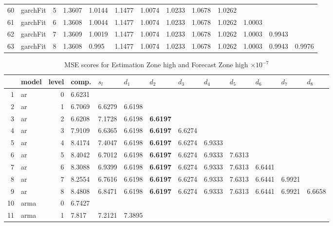 \documentclass[10pt,a4paper]{article}
\begin{document}
\begin{table}[ht]
\begin{tabular}{rlrllllllllll}
  60 & garchFit &     5 & 1.3607 & 1.0144 & 1.1477 & 1.0074 & 1.0233 & 1.0678 & 1.0262 &  &  &  \\ 
  61 & garchFit &     6 & 1.3608 & 1.0044 & 1.1477 & 1.0074 & 1.0233 & 1.0678 & 1.0262 & 1.0003 &  &  \\ 
  62 & garchFit &     7 & 1.3609 & 1.0019 & 1.1477 & 1.0074 & 1.0233 & 1.0678 & 1.0262 & 1.0003 & 0.9943 &  \\ 
  63 & garchFit &     8 & 1.3608 & 0.995 & 1.1477 & 1.0074 & 1.0233 & 1.0678 & 1.0262 & 1.0003 & 0.9943 & 0.9976 \\ 
   \hline
\end{tabular}
\end{table}
\begin{table}[ht]
\centering
\caption{MSE scores for Estimation Zone high and Forecast Zone high $ \times 10^{-7}$} 
\begin{tabular}{rlrllllllllll}
  \hline
 & model & level & comp. & $s_l$ & $d_1$ & $d_2$ & $d_3$ & $d_4$ & $d_5$ & $d_6$ & $d_7$ & $d_8$ \\ 
  \hline
1 & ar &     0 & 6.6231 &  &  &  &  &  &  &  &  &  \\ 
  2 & ar &     1 & 6.7069 & 6.6279 & 6.6198 &  &  &  &  &  &  &  \\ 
  3 & ar &     2 & 6.6208 & 7.1728 & 6.6198 & \textbf{6.6197} &  &  &  &  &  &  \\ 
  4 & ar &     3 & 7.9109 & 6.6365 & 6.6198 & \textbf{6.6197} & 6.6274 &  &  &  &  &  \\ 
  5 & ar &     4 & 8.4174 & 7.4047 & 6.6198 & \textbf{6.6197} & 6.6274 & 6.9333 &  &  &  &  \\ 
  6 & ar &     5 & 8.4042 & 6.7012 & 6.6198 & \textbf{6.6197} & 6.6274 & 6.9333 & 7.6313 &  &  &  \\ 
  7 & ar &     6 & 8.3088 & 6.9399 & 6.6198 & \textbf{6.6197} & 6.6274 & 6.9333 & 7.6313 & 6.6441 &  &  \\ 
  8 & ar &     7 & 8.2554 & 6.7616 & 6.6198 & \textbf{6.6197} & 6.6274 & 6.9333 & 7.6313 & 6.6441 & 6.9921 &  \\ 
  9 & ar &     8 & 8.4808 & 6.8471 & 6.6198 & \textbf{6.6197} & 6.6274 & 6.9333 & 7.6313 & 6.6441 & 6.9921 & 6.6658 \\ 
   \hline
10 & arma &     0 & 6.7427 &  &  &  &  &  &  &  &  &  \\ 
  11 & arma &     1 & 7.817 & 7.2121 & 7.3895 &  &  &  &  &  &  &  \\ 

\end{tabular}
\end{table}
\end{document}
